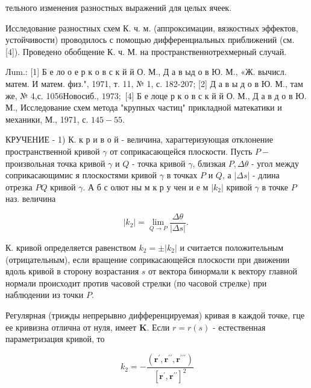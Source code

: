 \documentclass[10pt]{article}
\begin{document}
тельного изменения разностных выражений для целых ячеек.



Исследование разностных схем К. ч. м. (аппроксимации, вязкостных эффектов, устойчивости) проводилось с помощью дифференциальных приближений (см. [4]). Проведено обобщение К. ч. М. на пространственнотрехмерный случай.



Лum.: [1] Б е ло о е р к о в с к й й О. М., Д а в ыд о в Ю. М., «Ж. вычисл. матем. И матем. физ.", 1971, т. 11, № 1, с. 182-207; [2] Д а в ы д о в Ю. М., там же, № 4,с. 1056Новосиб., $1973 ;$ [4] Б е лоце р к о в с к й й О. М., Д а в д о в Ю. М., Исследование схем метода "крупных частиц" прикладной матекатики и механики, М., 1971, с. $145-55$.



КРУЧЕНИЕ - 1) К. к р и в о й - величина, харагтеризующая отклонение пространственной кривой $\gamma$ от соприкасающейся плоскости. Пусть $P-$ произвольная точка кривой $\gamma$ и $Q$ - точка кривой $\gamma$, близкая $P, \Delta \theta$ - угол между соприкасающимис я плоскостями кривой $\gamma$ в точках $P$ и $Q$, а $|\Delta s|$ - длина отрезка $P Q$ кривой $\gamma$. А б с олют ны м к р у чен и е м $\left|k_{2}\right|$ кривой $\gamma$ в точке $P$ наз. величина



\[

\left|k_{2}\right|=\lim _{Q \rightarrow P} \frac{\Delta \theta}{|\Delta s|} \text {. }

\]



К. кривой определяется равенством $k_{2}= \pm\left|k_{2}\right|$ и считается положительным (отрицательным), если вращение соприкасающейся плоскости при движении вдоль кривой в сторону возрастания $s$ от вектора бинормали к вектору главной нормали происходит против часовой стрелки (по часовой стрелке) при наблюдении из точки $P$.



Регулярная (трижды непрерывно дифференцируемая) кривая в каждой точке, гце ее кривизна отлична от нуля, имеет $\mathbf{K}$. Если $r=r(s)$ - естественная параметризация кривой, то



\[

k_{2}=-\frac{\left(\boldsymbol{r}^{\prime}, \boldsymbol{r}^{\prime \prime}, \boldsymbol{r}^{\prime \prime \prime}\right)}{\left[\boldsymbol{r}^{\prime}, \boldsymbol{r}^{\prime \prime}\right]^{2}}

\]
\end{document}
